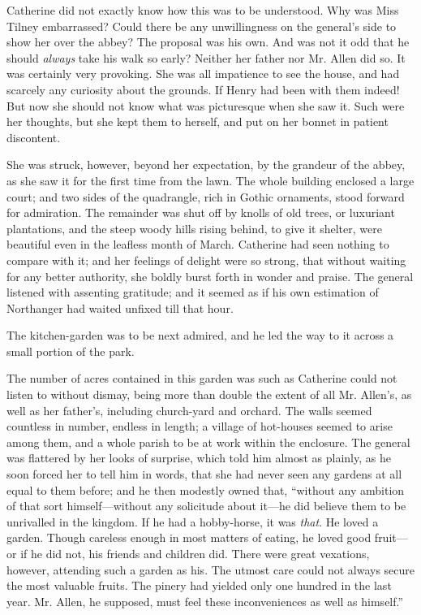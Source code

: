 Catherine did not exactly know how this was to be understood. Why was Miss Tilney embarrassed? Could there be any unwillingness on the general's side to show her over the abbey? The proposal was his own. And was not it odd that he should {\em always} take his walk so early? Neither her father nor Mr. Allen did so. It was certainly very provoking. She was all impatience to see the house, and had scarcely any curiosity about the grounds. If Henry had been with them indeed! But now she should not know what was picturesque when she saw it. Such were her thoughts, but she kept them to herself, and put on her bonnet in patient discontent.

She was struck, however, beyond her expectation, by the grandeur of the abbey, as she saw it for the first time from the lawn. The whole building enclosed a large court; and two sides of the quadrangle, rich in Gothic ornaments, stood forward for admiration. The remainder was shut off by knolls of old trees, or luxuriant plantations, and the steep woody hills rising behind, to give it shelter, were beautiful even in the leafless month of March. Catherine had seen nothing to compare with it; and her feelings of delight were so strong, that without waiting for any better authority, she boldly burst forth in wonder and praise. The general listened with assenting gratitude; and it seemed as if his own estimation of Northanger had waited unfixed till that hour.

The kitchen-garden was to be next admired, and he led the way to it across a small portion of the park.

The number of acres contained in this garden was such as Catherine could not listen to without dismay, being more than double the extent of all Mr. Allen's, as well as her father's, including church-yard and orchard. The walls seemed countless in number, endless in length; a village of hot-houses seemed to arise among them, and a whole parish to be at work within the enclosure. The general was flattered by her looks of surprise, which told him almost as plainly, as he soon forced her to tell him in words, that she had never seen any gardens at all equal to them before; and he then modestly owned that, “without any ambition of that sort himself---without any solicitude about it---he did believe them to be unrivalled in the kingdom. If he had a hobby-horse, it was {\em that}. He loved a garden. Though careless enough in most matters of eating, he loved good fruit---or if he did not, his friends and children did. There were great vexations, however, attending such a garden as his. The utmost care could not always secure the most valuable fruits. The pinery had yielded only one hundred in the last year. Mr. Allen, he supposed, must feel these inconveniences as well as himself.”

